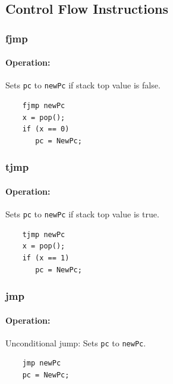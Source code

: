 \subsection{Control Flow Instructions}

\subsubsection{fjmp}

\paragraph{Operation:}
Sets \lstinline$pc$ to \lstinline$newPc$ if stack top value is false.

	\begin{lstlisting}
	fjmp newPc
	x = pop();
	if (x == 0)
	   pc = NewPc;
	\end{lstlisting}

\subsubsection{tjmp}

\paragraph{Operation:}
Sets \lstinline$pc$ to \lstinline$newPc$ if stack top value is true.

	\begin{lstlisting}
	tjmp newPc
	x = pop();
	if (x == 1)
	   pc = NewPc;
	\end{lstlisting}

\subsubsection{jmp}

\paragraph{Operation:}
Unconditional jump: Sets \lstinline$pc$ to \lstinline$newPc$.

	\begin{lstlisting}
	jmp newPc
	pc = NewPc;
	\end{lstlisting}

